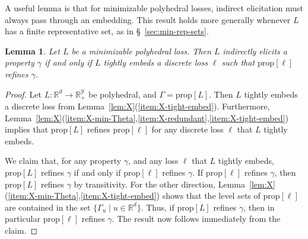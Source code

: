 \documentclass[11pt]{article}
\newcommand{\reals}{\mathbb{R}}
\newcommand{\prop}[1]{\mathrm{prop}[#1]}
\newcommand{\Y}{\mathcal{Y}}
\newtheorem{lemma}{Lemma}
\begin{document}
A useful lemma is that for minimizable polyhedral losses, indirect elicitation must always pass through an embedding.
This result holds more generally whenever $L$ has a finite representative set, as in \S~\ref{sec:min-rep-sets}.
\begin{lemma}\label{lem:ie-iff-embeds-refinement}
  Let $L$ be a minimizable polyhedral loss.
  Then $L$ indirectly elicits a property $\gamma$ if and only if $L$ tightly embeds a discrete loss $\ell$ such that $\prop \ell$ refines $\gamma$.
\end{lemma}
\begin{proof}
  Let $L:\reals^d\to\reals^\Y_+$ be polyhedral, and $\Gamma = \prop L$.
  Then $L$ tightly embeds a discrete loss from Lemma~\ref{lem:X}(\ref{item:X-tight-embed}).
  Furthermore, Lemma~\ref{lem:X}(\ref{item:X-min-Theta},\ref{item:X-redundant},\ref{item:X-tight-embed}) implies that $\prop L$ refines $\prop \ell$ for any discrete loss $\ell$ that $L$ tightly embeds.

  We claim that, for any property $\gamma$, and any loss $\ell$ that $L$ tightly embeds, $\prop L$ refines $\gamma$ if and only if $\prop \ell$ refines $\gamma$.
  If $\prop \ell$ refines $\gamma$, then $\prop L$ refines $\gamma$ by transitivity.
  For the other direction, Lemma~\ref{lem:X}(\ref{item:X-min-Theta},\ref{item:X-tight-embed}) shows that the level sets of $\prop \ell$ are contained in the set $\{\Gamma_u \mid u\in\reals^d\}$.
  Thus, if $\prop L$ refines $\gamma$, then in particular $\prop \ell$ refines $\gamma$.
  The result now follows immediately from the claim.
\end{proof}
\end{document}
